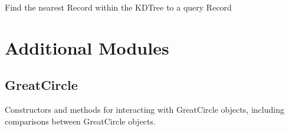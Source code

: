 \documentclass[letterpaper,10pt,english]{sphinxmanual}
\begin{document}
\begin{fulllineitems}
\begin{fulllineitems}
\label{\detokenize{kdtree:geotrees.kdtree.KDTree.query}}
\pysigstartsignatures
\pysiglinewithargsret
{}
{}
{}
\pysigstopsignatures
\sphinxAtStartPar
Find the nearest Record within the KDTree to a query Record
\begin{quote}\begin{description}
\sphinxAtStartPar
{}

\end{description}\end{quote}

\end{fulllineitems}


\end{fulllineitems}


\sphinxstepscope


\chapter{Additional Modules}
\label{\detokenize{users_guide:module-geotrees.great_circle}}\label{\detokenize{users_guide:additional-modules}}\label{\detokenize{users_guide::doc}}

\section{GreatCircle}
\label{\detokenize{users_guide:greatcircle}}
\sphinxAtStartPar
Constructors and methods for interacting with GreatCircle objects, including
comparisons between GreatCircle objects.
\end{document}
